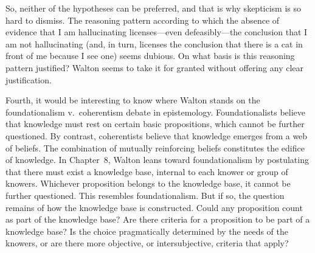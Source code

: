\documentclass[12pt]{article}
\begin{document}
So, neither of the hypotheses can be preferred, and that is why skepticism is so hard to dismiss.
The reasoning pattern according to which the absence of evidence that I am hallucinating 
licenses---even defeasibly---the conclusion that I am not hallucinating (and, in turn, licenses the conclusion that 
there is a cat in front of me because I see one) seems dubious. %
On what basis is this reasoning pattern justified?
Walton seems to take it for granted without 
offering any clear justification. %



Fourth, it would be interesting to know where Walton stands on the foundationalism v.\ coherentism 
debate in epistemology. Foundationalists believe that knowledge must rest on certain basic propositions, which cannot be further questioned. By contrast, coherentists believe that knowledge emerges from a web of beliefs. The combination of mutually reinforcing beliefs constitutes 
the edifice of knowledge. In Chapter~8, %
Walton leans toward foundationalism by postulating that there must exist a knowledge base, internal to each knower or group of knowers. 
Whichever proposition belongs to the knowledge base, it cannot be further questioned.
This resembles foundationalism. But if so, the question remains of how 
the knowledge base is constructed. Could any proposition count as 
part of the knowledge base? Are there criteria for a proposition 
to be part of a knowledge base? Is the choice pragmatically determined 
by the needs of the knowers, or are there more objective, 
or intersubjective, criteria that apply?
\end{document}
